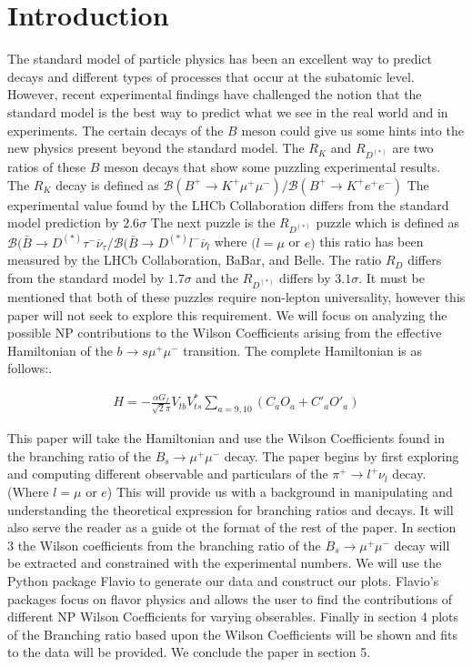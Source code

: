\documentclass[12pt]{article}
\def \bea{\begin{eqnarray}}
\def \eea{\end{eqnarray}}
\def \onu{\overline{\nu}}
\def \si{\sigma}
\begin{document}
\section{Introduction}
The standard model of particle physics has been an excellent way to predict decays and different types of processes that occur at the subatomic level. However, recent experimental findings have challenged the notion that the standard model is the best way to predict what we see in the real world and in experiments. The certain decays of the $B$ meson could give us some hints into the new physics present beyond the standard model. The $R_K$ and $R_{D^(*)}$ are two ratios of these $B$ meson decays that show some puzzling experimental results. The $R_K$ decay is defined as $\mathcal{B}(B^+\rightarrow K^+\mu^+\mu^-)/ \mathcal{B}(B^+\rightarrow K^+e^+e^-)$ The experimental value found by the LHCb Collaboration differs from the standard model prediction by $2.6\si$ \cite{Bhattacharya:2016mcc} The next puzzle is the $R_{D^(*)}$ puzzle which is defined as $\mathcal{B}(\bar{B} \rightarrow D^{(*)}\tau^- \onu_{\tau}/ \mathcal{B}(\bar{B} \rightarrow D^{(*)}l^- \onu_{l}$ where $(l= \mu$ or $e)$ this ratio has been measured by the LHCb  Collaboration, BaBar, and Belle. The ratio $R_D$ differs from the standard model by $1.7\si$ and the $R_{D^(*)}$ differs by $3.1\si$. It must be mentioned that both of these puzzles require non-lepton universality, however this paper will not seek to explore this requirement. We will focus on analyzing the possible NP contributions to the Wilson Coefficients arising from the effective Hamiltonian of the $b \rightarrow s\mu^+\mu^-$ transition. The complete Hamiltonian is as follows:\cite{Bhattacharya:2016mcc}. 
\begin{center}
\bea
H = -\frac{\alpha G_f}{\sqrt{2}\pi} V_{tb}V^*_{ts}\sum_{a= 9,10}^{}(C_aO_a + C'_aO'_a)
\eea
\end{center}
This paper will take the Hamiltonian and use the Wilson Coefficients found in the branching ratio of the $B_s \rightarrow \mu^+ \mu^- $ decay. The paper begins by first exploring and computing different observable and particulars of the $\pi^+ \rightarrow l^+ \nu_l $ decay. (Where $l= \mu$ or $e$) This will provide us with a background in manipulating and understanding the theoretical expression for branching ratios and decays. It will also serve the reader as a guide ot the format of the rest of the paper. In section 3 the Wilson coefficients from the branching ratio of the $B_s \rightarrow \mu^+\mu^-$ decay will be extracted and constrained with the experimental numbers. We will use the Python package Flavio to generate our data and construct our plots. Flavio's packages focus on flavor physics and allows the user to find the contributions of different NP Wilson Coefficients for varying obserables. Finally in section 4 plots of the Branching ratio based upon the Wilson Coefficients will be shown and fits to the data will be provided. We conclude the paper in section 5. 
\end{document}
